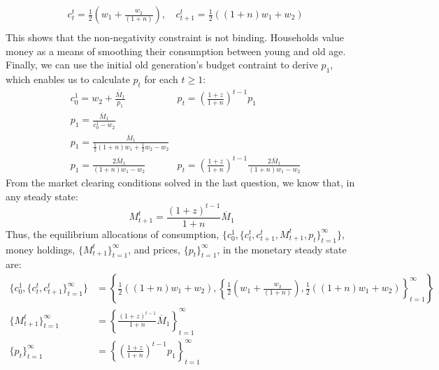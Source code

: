 \documentclass{article}
\begin{document}
\begin{enumerate}
\begin{align*}
			&c_t^t 		= \frac{1}{2}\left(w_1 + \frac{w_2}{(1+n)}\right)\text{, }	& c_{t+1}^t = \frac{1}{2}\left((1+n)w_1 + w_2\right) \\
		\end{align*}
		This shows that the non-negativity constraint is not binding. Households value money as a means of smoothing their consumption between young and old age. Finally, we can use the initial old generation's budget contraint to derive $p_1$, which enables us to calculate $p_t$ for each $t\geq 1$:
		\begin{align*}
			&c_0^1 = w_2 + \frac{\overline{M}_1}{p_1}								& p_t = \left(\frac{1+z}{1+n}\right)^{t-1}p_1	   \\
			&p_1 = \frac{\overline{M}_1}{c_0^1-w_2}									& \\
			&p_1 = \frac{\overline{M}_1}{\frac{1}{2}(1+n)w_1 + \frac{1}{2}w_2-w_2}	& \\
			&p_1 = \frac{2\overline{M}_1}{(1+n)w_1-w_2}	&p_t = \left(\frac{1+z}{1+n}\right)^{t-1}\frac{2\overline{M}_1}{(1+n)w_1-w_2}
		\end{align*}
		From the  market clearing conditions solved in the last question, we know that, in any steady state:
		\[
			M_{t+1}^t = \frac{(1+z)^{t-1}}{1+n}\overline{M}_1
		\]
		Thus, the equilibrium allocations of consumption, $\{c_0^1,\{c_t^t,c^t_{t+1},M_{t+1}^t,p_t\}_{t=1}^\infty\}$, money holdings, $\{M_{t+1}^t\}_{t=1}^\infty$, and prices, $\{p_t\}_{t=1}^\infty$, in the monetary steady state are:
		\begin{align*}
			\{c_0^1,\{c_t^t,c^t_{t+1}\}_{t=1}^\infty\} &= \left\{\frac{1}{2}\left((1+n)w_1 + w_2\right), \left\{\frac{1}{2}\left(w_1 + \frac{w_2}{(1+n)}\right),\frac{1}{2}\left((1+n)w_1 + w_2\right) \right\}_{t=1}^\infty\right\} \\
			\{M_{t+1}^t\}_{t=1}^\infty &= \left\{\frac{(1+z)^{t-1}}{1+n}\overline{M}_1 \right\}_{t=1}^\infty \\
			\{p_t\}_{t=1}^\infty &= \left\{\left(\frac{1+z}{1+n}\right)^{t-1}p_1 \right\}_{t=1}^\infty
		\end{align*}
		

\end{enumerate}
\end{document}
